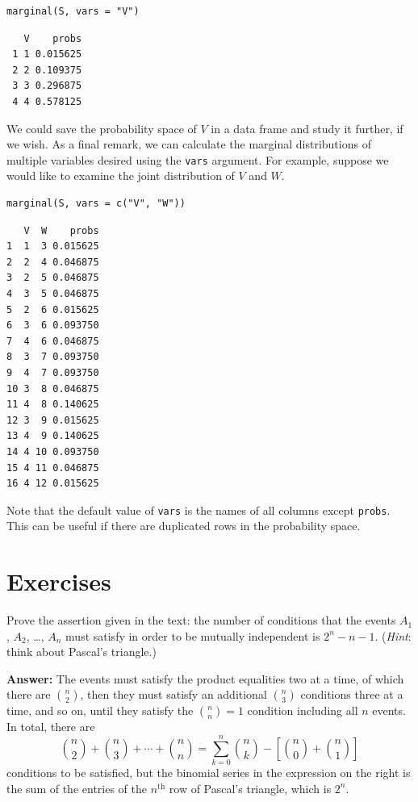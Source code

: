 \documentclass[captions=tableheading]{scrbook}
\begin{document}
\begin{verbatim}
marginal(S, vars = "V")
\end{verbatim}

\begin{verbatim}
   V    probs
 1 1 0.015625
 2 2 0.109375
 3 3 0.296875
 4 4 0.578125
\end{verbatim}

We could save the probability space of \(V\) in a data frame and study it further, if we wish. As a final remark, we can calculate the marginal distributions of multiple variables desired using the \texttt{vars} argument. For example, suppose we would like to examine the joint distribution of \(V\) and \(W\). 


\begin{verbatim}
marginal(S, vars = c("V", "W"))
\end{verbatim}


\begin{verbatim}
   V  W    probs
1  1  3 0.015625
2  2  4 0.046875
3  2  5 0.046875
4  3  5 0.046875
5  2  6 0.015625
6  3  6 0.093750
7  4  6 0.046875
8  3  7 0.093750
9  4  7 0.093750
10 3  8 0.046875
11 4  8 0.140625
12 3  9 0.015625
13 4  9 0.140625
14 4 10 0.093750
15 4 11 0.046875
16 4 12 0.015625
\end{verbatim}

Note that the default value of \texttt{vars} is the names of all columns except \texttt{probs}. This can be useful if there are duplicated rows in the probability space.

\newpage{}
\section{Exercises}
\label{sec-4-10}


\setcounter{thm}{0}

\begin{xca}
Prove the assertion given in the text: the number of conditions that the events \(A_{1}\), \(A_{2}\), \ldots{}, \(A_{n}\) must satisfy in order to be mutually independent is \(2^{n}-n-1\). (\emph{Hint}: think about Pascal's triangle.)
\end{xca}

\textbf{Answer:}
The events must satisfy the product equalities two at a time, of which there are \({n \choose 2}\), then they must satisfy an additional \({n \choose 3}\) conditions three at a time, and so on, until they satisfy the \({n \choose n}=1\) condition including all \(n\) events. In total, there are 
\[
{n \choose 2}+{n \choose 3}+\cdots+{n \choose n}=\sum_{k=0}^{n}{n \choose k}-\left[{n \choose 0}+{n \choose 1}\right]
\]
conditions to be satisfied, but the binomial series in the expression on the right is the sum of the entries of the \(n^{\mathrm{th}}\) row of Pascal's triangle, which is \(2^{n}\).
\end{document}
